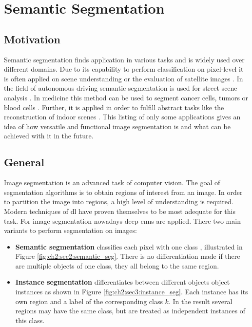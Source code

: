 
\section{Semantic Segmentation}\label{ord:ch2:sec2}

\subsection{Motivation}\label{ord:ch2:sec2:subsec_motivation}
Semantic segmentation finds application in various tasks and is widely used over different domains.
Due to its capability to perform classification on pixel-level it is often applied on scene understanding \cite{LiJ09-SceneUnderstanding} or the evaluation of satellite images \cite{Li18-SateliteImagery}.
In the field of autonomous driving semantic segmentation is used for street scene analysis \cite{Cor16-Cityscapes} \cite{Men15-AutonVehicles} \cite{Neu17-MapillaryDataset}.
In medicine this method can be used to segment cancer cells, tumors \cite{RF15-U-Net} or blood cells \cite{Tran19-BloodCell}.
Further, it is applied in order to fulfill abstract tasks like the reconstruction of indoor scenes \cite{Dai17-ReconstructionIndoorScenes}.
This listing of only some applications gives an idea of how versatile and functional image segmentation is and what can be achieved with it in the future.


\subsection{General}\label{ord:ch2:sec2:subsec_general}
Image segmentation is an advanced task of computer vision.
The goal of segmentation algorithms is to obtain regions of interest from an image.
In order to partition the image into regions, a high level of understanding is required.
Modern techniques of \gls{dl} have proven themselves to be most adequate for this task.
For image segmentation nowadays deep \glspl{cnn} are applied.
There two main variants to perform segmentation on images:
\begin{itemize}
	\item \textbf{Semantic segmentation} classifies each pixel with one class \cite{RF15-U-Net} \cite{Zhao17-PSP}, illustrated in Figure \ref{fig:ch2:sec2:semantic_seg}.
	There is no differentiation made if there are multiple objects of one class, they all belong to the same region.
	\item \textbf{Instance segmentation} differentiates between different objects object instances \cite{DHS16-MNC} \cite{He17-MaskR-CNN} as shown in Figure \ref{fig:ch2:sec3:instance_seg}.
	Each instance has its own region and a label of the corresponding class $k$.
	In the result several regions may have the same class, but are treated as independent instances of this class.
\end{itemize}

